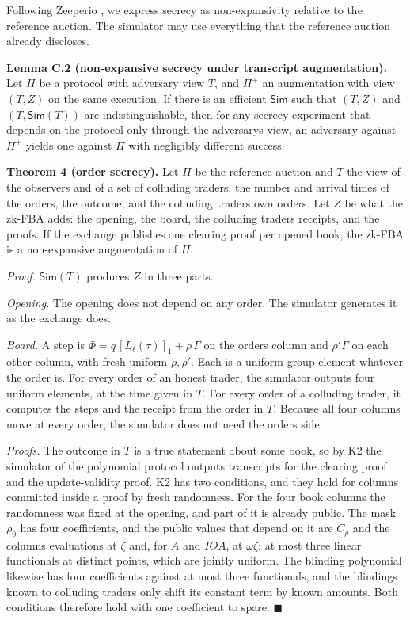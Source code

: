 Following Zeeperio \cite{zeeperio2026}, we express secrecy as non-expansivity relative to the reference auction. The simulator may use everything that the reference auction already discloses.

\textbf{Lemma C.2 (non-expansive secrecy under transcript augmentation).} Let \(\Pi\) be a protocol with adversary view \(T\), and \(\Pi^+\) an augmentation with view \((T, Z)\) on the same execution. If there is an efficient \(\mathsf{Sim}\) such that \((T, Z)\) and \((T, \mathsf{Sim}(T))\) are indistinguishable, then for any secrecy experiment that depends on the protocol only through the adversary\textquotesingle s view, an adversary against \(\Pi^+\) yields one against \(\Pi\) with negligibly different success.

\textbf{Theorem 4 (order secrecy).} Let \(\Pi\) be the reference auction and \(T\) the view of the observers and of a set of colluding traders: the number and arrival times of the orders, the outcome, and the colluding traders\textquotesingle{} own orders. Let \(Z\) be what the zk-FBA adds: the opening, the board, the colluding traders\textquotesingle{} receipts, and the proofs. If the exchange publishes one clearing proof per opened book, the zk-FBA is a non-expansive augmentation of \(\Pi\).

\emph{Proof.} \(\mathsf{Sim}(T)\) produces \(Z\) in three parts.

\emph{Opening.} The opening does not depend on any order. The simulator generates it as the exchange does.

\emph{Board.} A step is \(\Phi = q\,[L_\ell(\tau)]_1 + \rho\,\Gamma\) on the order\textquotesingle s column and \(\rho'\Gamma\) on each other column, with fresh uniform \(\rho, \rho'\). Each is a uniform group element whatever the order is. For every order of an honest trader, the simulator outputs four uniform elements, at the time given in \(T\). For every order of a colluding trader, it computes the steps and the receipt from the order in \(T\). Because all four columns move at every order, the simulator does not need the order\textquotesingle s side.

\emph{Proofs.} The outcome in \(T\) is a true statement about some book, so by K2 the simulator of the polynomial protocol outputs transcripts for the clearing proof and the update-validity proof. K2 has two conditions, and they hold for columns committed inside a proof by fresh randomness. For the four book columns the randomness was fixed at the opening, and part of it is already public. The mask \(\rho_0\) has four coefficients, and the public values that depend on it are \(C_\rho\) and the column\textquotesingle s evaluations at \(\zeta\) and, for \(A\) and \(IOA\), at \(\omega\zeta\): at most three linear functionals at distinct points, which are jointly uniform. The blinding polynomial likewise has four coefficients against at most three functionals, and the blindings known to colluding traders only shift its constant term by known amounts. Both conditions therefore hold with one coefficient to spare. \(\blacksquare\)

